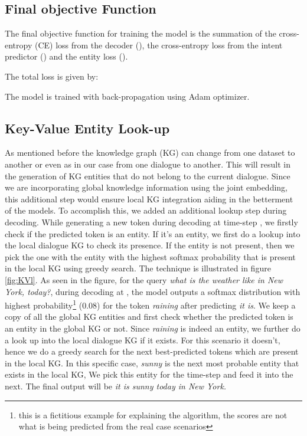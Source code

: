 \documentclass[runningheads]{llncs}
\begin{document}
\subsection{Final objective Function}

The final objective function for training the model is the summation of the cross-entropy (CE) loss from the decoder (), the cross-entropy loss from the intent predictor () and the entity loss ().

\noindent
The total loss is given by:


\noindent
The model is trained with back-propagation using Adam \cite{kingma2014adam} optimizer.

\subsection{Key-Value Entity Look-up}
\label{kvl}
As mentioned before the knowledge graph (KG) can change from one dataset to another or even as in our case from one dialogue to another. This will result in the generation of KG entities that do not belong to the current dialogue. Since we are incorporating global knowledge information using the joint embedding, this additional step would ensure local KG integration aiding in the betterment of the models.
To accomplish this, we added an additional lookup step during decoding. While generating a new token during decoding at time-step , we firstly check if the predicted token is an entity. If it's an entity, we first do a lookup into the local dialogue KG to check its presence. If the entity is not present, then we pick the one with the entity with the highest softmax probability that is present in the local KG using greedy search. The technique is illustrated in figure \ref{fig:KVl}. As seen in the figure, for the query \textit{what is the weather like in New York, today?}, during decoding at , the model outputs a softmax distribution with highest probability\footnote{this is a fictitious example for explaining the algorithm, the scores are not what is being predicted from the real case scenarios} (0.08) for the token \textit{raining} after predicting \textit{it is}. We keep a copy of all the global KG entities and first check whether the predicted token is an entity in the global KG or not. Since \textit{raining} is indeed an entity, we further do a look up into the local dialogue KG if it exists. For this scenario it doesn't, hence we do a greedy search for the next best-predicted tokens which are present in the local KG. In this specific case, \textit{sunny} is the next most probable entity that exists in the local KG, We pick this entity for the time-step and feed it into the next. The final output will be \textit{it is sunny today in New York.} 
\end{document}
